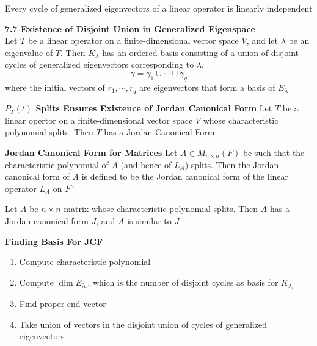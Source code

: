 \documentclass[11pt]{article}
\begin{document}
\begin{corollary*}
    Every cycle of generalized eigenvectors of a linear operator is linearly independent
\end{corollary*}


\begin{theorem*}
    \textbf{7.7 Existence of Disjoint Union in Generalized Eigenspace}\\ 
    Let $T$ be a linear operator on a finite-dimensional vector space $V$, and let $\lambda$ be an eigenvalue of $T$. Then $K_{\lambda}$ has an ordered basis consisting of a union of disjoint cycles of generalized eigenvectors corresponding to $\lambda$, 
    \[
        \gamma = \gamma_1 \cup \cdots \cup \gamma_q
    \]
    where the initial vectors of $r_1, \cdots, r_q$ are eigenvectors that form a basis of $E_{\lambda}$
\end{theorem*}

\begin{corollary*}
    \textbf{$P_T(t)$ Splits Ensures Existence of Jordan Canonical Form} Let $T$ be a linear opertor on a finite-dimensional vector space $V$ whose characteristic polynomial splits. Then $T$ has a Jordan Canonical Form
\end{corollary*}

\begin{defn*}
    \textbf{Jordan Canonical Form for Matrices} Let $A\in M_{n\times n}(F)$ be such that the characteristic polynomial of $A$ (and hence of $L_A$) splits. Then the Jordan canonical form of $A$ is defined to be the Jordan canonical form of the linear operator $L_A$ on $F^n$
\end{defn*}

\begin{corollary*}
    Let $A$ be $n\times n$ matrix whose characteristic polynomial splits. Then $A$ has a Jordan canonical form $J$, and $A$ is similar to $J$
\end{corollary*}

\begin{defn*}
    \textbf{Finding Basis For JCF}
    \begin{enumerate}
        \item Compute characteristic polynomial 
        \item Compute $\dim{E_{\lambda_i}}$, which is the number of disjoint cycles as basis for $K_{\lambda_i}$
        \item Find proper end vector
        \item Take union of vectors in the disjoint union of cycles of generalized eigenvectors
    \end{enumerate}
\end{defn*}
\end{document}
